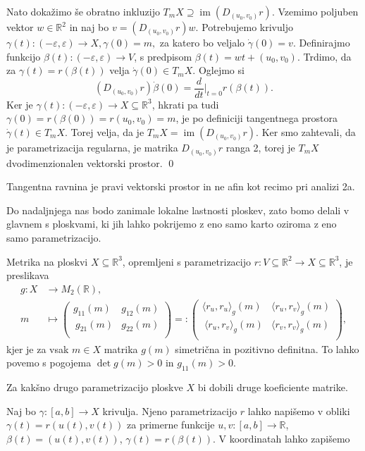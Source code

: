 Nato dokažimo še obratno inkluzijo $T_mX \supseteq
\operatorname{im} \left( D_{(u_0, v_0)}r \right)$. Vzemimo poljuben
vektor $w \in \mathbb{R}^2$ in naj bo $v = \left( D_{(u_0, v_0)} r \right) w$. Potrebujemo krivuljo $\gamma(t) : (-\varepsilon, \varepsilon) \to  X,
\gamma(0) = m,$ za katero bo veljalo $\dot{\gamma} (0) = v.$  Definirajmo funkcijo $\beta(t): (-\varepsilon, \varepsilon) \to V$,
s predpisom $\beta(t) = wt + (u_0, v_0)$. Trdimo, da za $\gamma(t) =
r(\beta(t))$  velja $\dot{\gamma}(0) \in  T_mX.$
Oglejmo si \begin{equation*} \left( D_{(u_0, v_0)}r \right)\dot{\beta} (0) =
\frac{d}{dt} \big|_{t = 0} r(\beta(t)). \end{equation*}   Ker je $\gamma(t): (-\varepsilon,
\varepsilon)\to  X \subseteq \mathbb{R}^3$, hkrati pa tudi $\gamma(0) = r(\beta(0) )= r(u_0, v_0) = m$, je po definiciji tangentnega prostora $\dot{\gamma}(t) \in T_mX$. Torej velja,
da je $T_mX = \operatorname{im}(D_{(u_0,v_0)}r)$. Ker smo zahtevali,
da je parametrizacija regularna, je matrika $D_{(u_0,v_0)}r$ ranga 2,
torej je  $T_mX$ dvodimenzionalen vektorski prostor.
\qed

\begin{opomba}
 Tangentna ravnina je pravi vektorski prostor in ne afin kot
 recimo pri analizi 2a.
\end{opomba}

Do nadaljnjega nas bodo zanimale lokalne lastnosti ploskev, zato bomo
delali v glavnem s ploskvami, ki jih lahko pokrijemo z eno samo karto
oziroma z eno samo parametrizacijo.

\begin{definicija}
\label{def_metrika_na_ploskvi}
 Metrika na ploskvi $X \subseteq  \mathbb{R}^3$, opremljeni s
 parametrizacijo $r: V \subseteq  \mathbb{R}^2 \to  X \subseteq
 \mathbb{R}^3$, je preslikava \begin{align*}
 	g: X &\longrightarrow M_2(\mathbb{R}), \\
 	m &\longmapsto 
	\begin{pmatrix}
		g_{11}(m) & g_{12}(m) \\\
		g_{21}(m) & g_{22}(m) \\
	\end{pmatrix} =: \begin{pmatrix}
		\langle r_u, r_u \rangle_g (m) & \langle r_u, r_v \rangle_g(m) \\\
		\langle r_u, r_v \rangle_g(m) & \langle r_v, r_v \rangle_g(m) \\
	\end{pmatrix},
 \end{align*}
 kjer je za vsak $m \in  X$ matrika $g(m)$ simetrična in pozitivno definitna. To lahko povemo s pogojema
 $\det g(m) > 0$ in $g_{11}(m) >0.$

\end{definicija}
\begin{opomba}
 Za kakšno drugo parametrizacijo ploskve $X$ bi dobili druge koeficiente
 matrike.
\end{opomba}
 Naj bo $\gamma: [a,b] \to  X$ krivulja. Njeno parametrizacijo $r$
lahko napišemo v obliki  $\gamma(t) = r(u(t), v(t))$ za primerne
funkcije $u,v : [a,b] \to \mathbb{R}$, $\beta(t) = (u(t), v(t))$,
$\gamma(t) = r(\beta(t)).$ V koordinatah lahko zapišemo 

